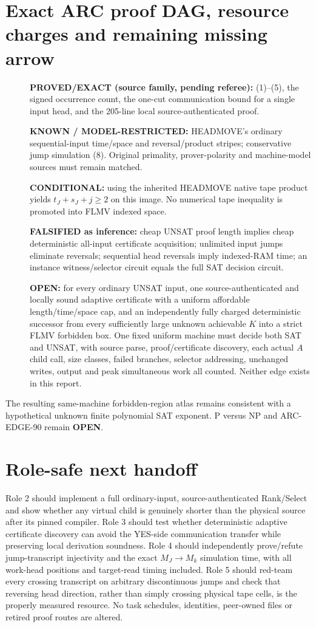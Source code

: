 \documentclass[11pt]{article}
\newcommand{\OPEN}{\textbf{OPEN}}
\begin{document}
\section{Exact ARC proof DAG, resource charges and remaining missing arrow}
\begin{description}
\item[] \textbf{PROVED/EXACT (source family, pending referee):} (1)--(5), the signed occurrence count, the one-cut communication bound for a single input head, and the 205-line local source-authenticated proof.
\item[] \textbf{KNOWN / MODEL-RESTRICTED:} HEADMOVE's ordinary sequential-input time/space and reversal/product stripes; conservative jump simulation (8). Original primality, prover-polarity and machine-model sources must remain matched.
\item[] \textbf{CONDITIONAL:} using the inherited HEADMOVE native tape product yields $t_J+s_J+j\ge2$ on this image. No numerical tape inequality is promoted into FLMV indexed space.
\item[] \textbf{FALSIFIED as inference:} cheap UNSAT proof length implies cheap deterministic all-input certificate acquisition; unlimited input jumps eliminate reversals; sequential head reversals imply indexed-RAM time; an instance witness/selector circuit equals the full SAT decision circuit.
\item[] \textbf{OPEN:} for every ordinary UNSAT input, one source-authenticated and locally sound adaptive certificate with a uniform affordable length/time/space cap, and an independently fully charged deterministic successor from every sufficiently large unknown achievable $K$ into a strict FLMV forbidden box. One fixed uniform machine must decide both SAT and UNSAT, with source parse, proof/certificate discovery, each actual $A$ child call, size classes, failed branches, selector addressing, unchanged writes, output and peak simultaneous work all counted. Neither edge exists in this report.
\end{description}
The resulting same-machine forbidden-region atlas remains consistent with a hypothetical unknown finite polynomial SAT exponent. P versus NP and ARC-EDGE-90 remain \OPEN.

\section{Role-safe next handoff}
Role 2 should implement a full ordinary-input, source-authenticated Rank/Select and show whether any virtual child is genuinely shorter than the physical source after its pinned compiler. Role 3 should test whether deterministic adaptive certificate discovery can avoid the YES-side communication transfer while preserving local derivation soundness. Role 4 should independently prove/refute jump-transcript injectivity and the exact $M_J\to M_k$ simulation time, with all work-head positions and target-read timing included. Role 5 should red-team every crossing transcript on arbitrary discontinuous jumps and check that reversing head direction, rather than simply crossing physical tape cells, is the properly measured resource. No task schedules, identities, peer-owned files or retired proof routes are altered.



\end{document}
